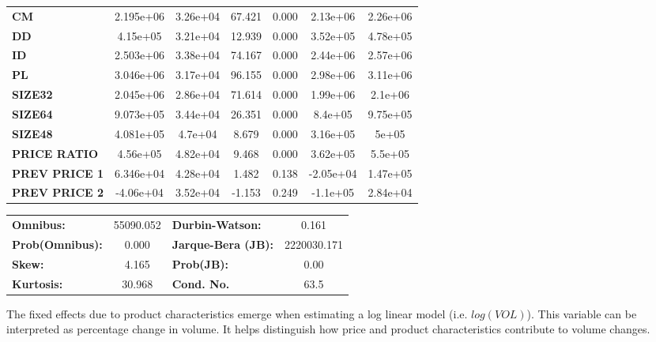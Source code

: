 \documentclass{article}
\begin{document}
\begin{center}
\begin{tabular}{lcccccc}
\textbf{CM}    &    2.195e+06  &     3.26e+04     &    67.421  &         0.000        &     2.13e+06    &     2.26e+06     \\
\textbf{DD}    &     4.15e+05  &     3.21e+04     &    12.939  &         0.000        &     3.52e+05    &     4.78e+05     \\
\textbf{ID}    &    2.503e+06  &     3.38e+04     &    74.167  &         0.000        &     2.44e+06    &     2.57e+06     \\
\textbf{PL}    &    3.046e+06  &     3.17e+04     &    96.155  &         0.000        &     2.98e+06    &     3.11e+06     \\
\textbf{SIZE32}    &    2.045e+06  &     2.86e+04     &    71.614  &         0.000        &     1.99e+06    &      2.1e+06     \\
\textbf{SIZE64}   &    9.073e+05  &     3.44e+04     &    26.351  &         0.000        &      8.4e+05    &     9.75e+05     \\
\textbf{SIZE48}   &    4.081e+05  &      4.7e+04     &     8.679  &         0.000        &     3.16e+05    &        5e+05     \\
\textbf{PRICE RATIO}   &     4.56e+05  &     4.82e+04     &     9.468  &         0.000        &     3.62e+05    &      5.5e+05     \\
\textbf{PREV PRICE 1}   &    6.346e+04  &     4.28e+04     &     1.482  &         0.138        &    -2.05e+04    &     1.47e+05     \\
\textbf{PREV PRICE 2}   &    -4.06e+04  &     3.52e+04     &    -1.153  &         0.249        &     -1.1e+05    &     2.84e+04     \\
\bottomrule
\end{tabular}
\begin{tabular}{lclc}
\textbf{Omnibus:}       & 55090.052 & \textbf{  Durbin-Watson:     } &      0.161   \\
\textbf{Prob(Omnibus):} &    0.000  & \textbf{  Jarque-Bera (JB):  } & 2220030.171  \\
\textbf{Skew:}          &    4.165  & \textbf{  Prob(JB):          } &       0.00   \\
\textbf{Kurtosis:}      &   30.968  & \textbf{  Cond. No.          } &       63.5   \\
\bottomrule
\end{tabular}
\end{center} 

The fixed effects due to product characteristics emerge when estimating a log linear model (i.e. $log(VOL)$).  This variable can be interpreted as percentage change in volume. It helps distinguish how price and product characteristics contribute to volume changes. 
\end{document}

